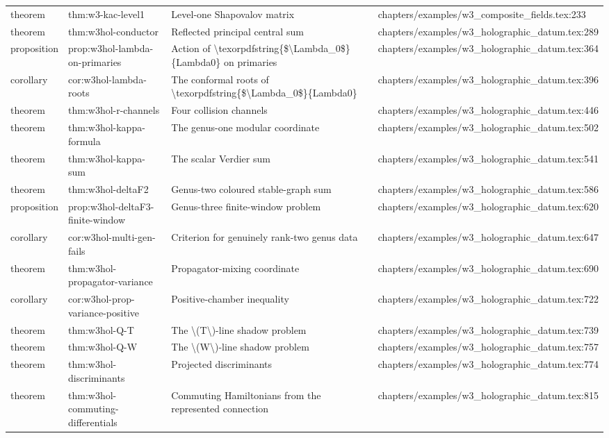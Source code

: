 \documentclass[11pt]{article}
\begin{document}
\begin{longtable}{L{0.10\textwidth}L{0.26\textwidth}L{0.42\textwidth}L{0.22\textwidth}}
theorem & thm:w3-kac-level1 & Level-one Shapovalov matrix & chapters/examples/w3\_composite\_fields.tex:233\\
theorem & thm:w3hol-conductor & Reflected principal central sum & chapters/examples/w3\_holographic\_datum.tex:289\\
proposition & prop:w3hol-lambda-on-primaries & Action of \textbackslash{}texorpdfstring\{\$\textbackslash{}Lambda\_0\$\}\{Lambda0\} on primaries & chapters/examples/w3\_holographic\_datum.tex:364\\
corollary & cor:w3hol-lambda-roots & The conformal roots of \textbackslash{}texorpdfstring\{\$\textbackslash{}Lambda\_0\$\}\{Lambda0\} & chapters/examples/w3\_holographic\_datum.tex:396\\
theorem & thm:w3hol-r-channels & Four collision channels & chapters/examples/w3\_holographic\_datum.tex:446\\
theorem & thm:w3hol-kappa-formula & The genus-one modular coordinate & chapters/examples/w3\_holographic\_datum.tex:502\\
theorem & thm:w3hol-kappa-sum & The scalar Verdier sum & chapters/examples/w3\_holographic\_datum.tex:541\\
theorem & thm:w3hol-deltaF2 & Genus-two coloured stable-graph sum & chapters/examples/w3\_holographic\_datum.tex:586\\
proposition & prop:w3hol-deltaF3-finite-window & Genus-three finite-window problem & chapters/examples/w3\_holographic\_datum.tex:620\\
corollary & cor:w3hol-multi-gen-fails & Criterion for genuinely rank-two genus data & chapters/examples/w3\_holographic\_datum.tex:647\\
theorem & thm:w3hol-propagator-variance & Propagator-mixing coordinate & chapters/examples/w3\_holographic\_datum.tex:690\\
corollary & cor:w3hol-prop-variance-positive & Positive-chamber inequality & chapters/examples/w3\_holographic\_datum.tex:722\\
theorem & thm:w3hol-Q-T & The \textbackslash{}(T\textbackslash{})-line shadow problem & chapters/examples/w3\_holographic\_datum.tex:739\\
theorem & thm:w3hol-Q-W & The \textbackslash{}(W\textbackslash{})-line shadow problem & chapters/examples/w3\_holographic\_datum.tex:757\\
theorem & thm:w3hol-discriminants & Projected discriminants & chapters/examples/w3\_holographic\_datum.tex:774\\
theorem & thm:w3hol-commuting-differentials & Commuting Hamiltonians from the represented connection & chapters/examples/w3\_holographic\_datum.tex:815\\

\end{longtable}
\end{document}
